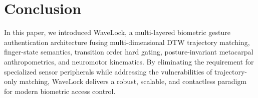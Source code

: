 \documentclass[conference]{IEEEtran}
\begin{document}
\section{Conclusion}
\label{sec:conclusion}

In this paper, we introduced WaveLock, a multi-layered biometric gesture authentication architecture fusing multi-dimensional DTW trajectory matching, finger-state semantics, transition order hard gating, posture-invariant metacarpal anthropometrics, and neuromotor kinematics. By eliminating the requirement for specialized sensor peripherals while addressing the vulnerabilities of trajectory-only matching, WaveLock delivers a robust, scalable, and contactless paradigm for modern biometric access control.
\end{document}
